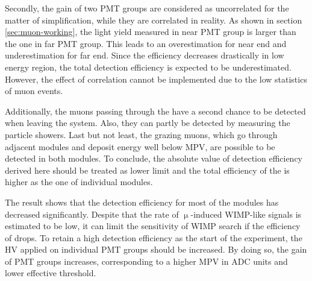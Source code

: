 Secondly, the gain of two PMT groups are considered as uncorrelated for the matter of simplification, while they are correlated in reality. As shown in section \ref{sec:muon-working}, the light yield measured in near PMT group is larger than the one in far PMT group. This leads to an overestimation for near end and underestimation for far end. Since the efficiency decreases drastically in low energy region, the total detection efficiency is expected to be underestimated. However, the effect of correlation cannot be implemented due to the low statistics of muon events.


Additionally, the muons passing through the \mvs{} have a second chance to be detected when leaving the system. Also, they can partly be detected by measuring the particle showers. Last but not least, the grazing muons, which go through adjacent modules and deposit energy well below MPV, are possible to be detected in both modules. To conclude, the absolute value of detection efficiency derived here should be treated as lower limit and the total efficiency of the \mvs{} is higher as the one of individual modules.

The result shows that the detection efficiency for most of the modules has decreased significantly. Despite that the rate of $\upmu{}$-induced WIMP-like signals is estimated to be low, it can limit the sensitivity of WIMP search if the efficiency of \mvs{} drops. To retain a high detection efficiency as the start of the experiment, the HV applied on individual PMT groups should be increased. By doing so, the gain of PMT groups increases, corresponding to a higher MPV in ADC units and lower effective threshold.




